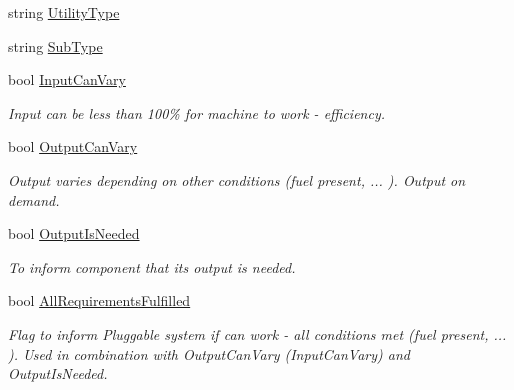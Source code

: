 \begin{DoxyCompactItemize}
string \hyperlink{interface_project_porcupine_1_1_power_network_1_1_i_pluggable_a5d4ca8ed761e31947af44b8a52b1ed48}{Utility\+Type}
\item 
string \hyperlink{interface_project_porcupine_1_1_power_network_1_1_i_pluggable_a8071775f37d8a2503bffac8c0319864b}{Sub\+Type}
\item 
bool \hyperlink{interface_project_porcupine_1_1_power_network_1_1_i_pluggable_a62c15aa91b21f585fd6e8002c7c764cb}{Input\+Can\+Vary}
\begin{DoxyCompactList}\small\item\em Input can be less than 100\% for machine to work -\/ efficiency. \end{DoxyCompactList}\item 
bool \hyperlink{interface_project_porcupine_1_1_power_network_1_1_i_pluggable_a7491aa53d81d7e614c22cca2274c60b7}{Output\+Can\+Vary}
\begin{DoxyCompactList}\small\item\em Output varies depending on other conditions (fuel present, ... ). Output on demand. \end{DoxyCompactList}\item 
bool \hyperlink{interface_project_porcupine_1_1_power_network_1_1_i_pluggable_a249477e8f058a146480c85807fdef875}{Output\+Is\+Needed}
\begin{DoxyCompactList}\small\item\em To inform component that its output is needed. \end{DoxyCompactList}\item 
bool \hyperlink{interface_project_porcupine_1_1_power_network_1_1_i_pluggable_a81caa152d37029ff758c5713162e69d7}{All\+Requirements\+Fulfilled}
\begin{DoxyCompactList}\small\item\em Flag to inform Pluggable system if can work -\/ all conditions met (fuel present, ... ). Used in combination with Output\+Can\+Vary (Input\+Can\+Vary) and Output\+Is\+Needed. \end{DoxyCompactList}\end{DoxyCompactItemize}
